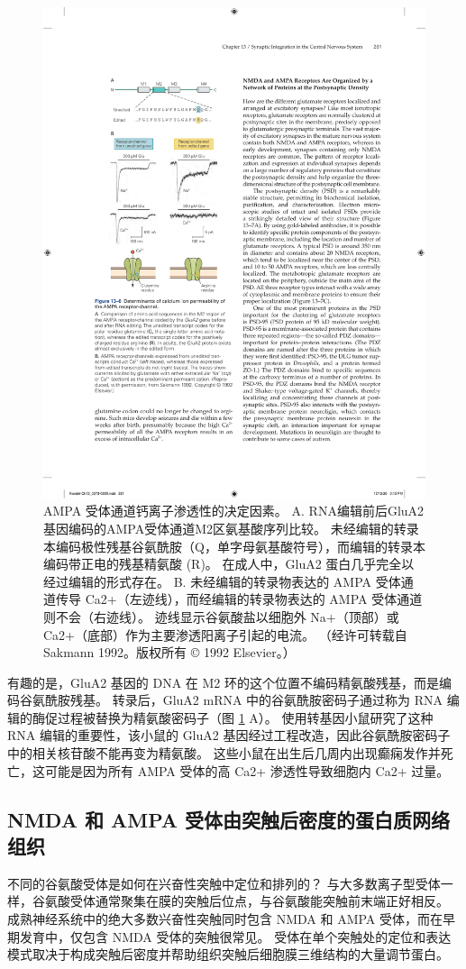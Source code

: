 \begin{figure}[htbp]
	\centering
	\includegraphics[width=0.45\linewidth]{chap13/fig_13_6}
	\caption{AMPA 受体通道钙离子渗透性的决定因素。 A. RNA编辑前后GluA2基因编码的AMPA受体通道M2区氨基酸序列比较。 未经编辑的转录本编码极性残基谷氨酰胺（Q，单字母氨基酸符号），而编辑的转录本编码带正电的残基精氨酸 (R)。 在成人中，GluA2 蛋白几乎完全以经过编辑的形式存在。 B. 未经编辑的转录物表达的 AMPA 受体通道传导 Ca2+（左迹线），而经编辑的转录物表达的 AMPA 受体通道则不会（右迹线）。 迹线显示谷氨酸盐以细胞外 Na+（顶部）或 Ca2+（底部）作为主要渗透阳离子引起的电流。 （经许可转载自 Sakmann 1992。版权所有 © 1992 Elsevier。）}
	\label{fig:13_6}
\end{figure}


有趣的是，GluA2 基因的 DNA 在 M2 环的这个位置不编码精氨酸残基，而是编码谷氨酰胺残基。 
转录后，GluA2 mRNA 中的谷氨酰胺密码子通过称为 RNA 编辑的酶促过程被替换为精氨酸密码子（图 \ref{fig:13_6} A）。
使用转基因小鼠研究了这种 RNA 编辑的重要性，该小鼠的 GluA2 基因经过工程改造，因此谷氨酰胺密码子中的相关核苷酸不能再变为精氨酸。 
这些小鼠在出生后几周内出现癫痫发作并死亡，这可能是因为所有 AMPA 受体的高 Ca2+ 渗透性导致细胞内 Ca2+ 过量。



\subsection{NMDA 和 AMPA 受体由突触后密度的蛋白质网络组织}

不同的谷氨酸受体是如何在兴奋性突触中定位和排列的？ 
与大多数离子型受体一样，谷氨酸受体通常聚集在膜的突触后位点，与谷氨酸能突触前末端正好相反。 
成熟神经系统中的绝大多数兴奋性突触同时包含 NMDA 和 AMPA 受体，而在早期发育中，仅包含 NMDA 受体的突触很常见。 
受体在单个突触处的定位和表达模式取决于构成突触后密度并帮助组织突触后细胞膜三维结构的大量调节蛋白。


